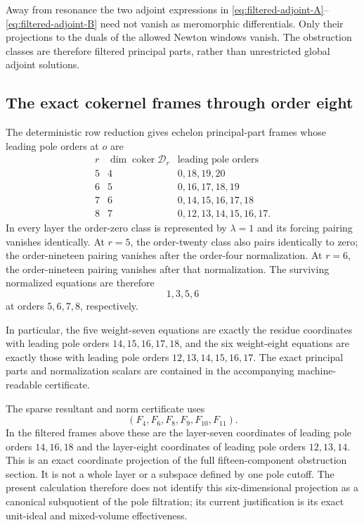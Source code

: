 \begin{remark}
Away from resonance the two adjoint expressions in
\eqref{eq:filtered-adjoint-A}--\eqref{eq:filtered-adjoint-B} need not vanish
as meromorphic differentials.  Only their projections to the duals of the
allowed Newton windows vanish.  The obstruction classes are therefore
filtered principal parts, rather than unrestricted global adjoint
solutions.
\end{remark}

\subsection{The exact cokernel frames through order eight}

The deterministic row reduction gives echelon principal-part frames whose
leading pole orders at $o$ are
\[
\begin{array}{c|c|c}
 r&\dim\operatorname{coker}\mathscr D_r&
 \text{leading pole orders}\\
\hline
5&4&0,18,19,20\\
6&5&0,16,17,18,19\\
7&6&0,14,15,16,17,18\\
8&7&0,12,13,14,15,16,17.
\end{array}
\]
In every layer the order-zero class is represented by $\lambda=1$ and its
forcing pairing vanishes identically.  At $r=5$, the order-twenty class also
pairs identically to zero; the order-nineteen pairing vanishes after the
order-four normalization.  At $r=6$, the order-nineteen pairing vanishes
after that normalization.  The surviving normalized equations are therefore
\[
1,3,5,6
\]
at orders $5,6,7,8$, respectively.

In particular, the five weight-seven equations are exactly the residue
coordinates with leading pole orders $14,15,16,17,18$, and the six
weight-eight equations are exactly those with leading pole orders
$12,13,14,15,16,17$.  The exact principal parts and normalization scalars
are contained in the accompanying machine-readable certificate.

\begin{remark}
The sparse resultant and norm certificate uses
\[
 (F_4,F_6,F_8,F_9,F_{10},F_{11}).
\]
In the filtered frames above these are the layer-seven coordinates of
leading pole orders $14,16,18$ and the layer-eight coordinates of leading
pole orders $12,13,14$.  This is an exact coordinate projection of the full
fifteen-component obstruction section.  It is not a whole layer or a
subspace defined by one pole cutoff.  The present calculation therefore
does not identify this six-dimensional projection as a canonical
subquotient of the pole filtration; its current justification is its exact
unit-ideal and mixed-volume effectiveness.
\end{remark}
